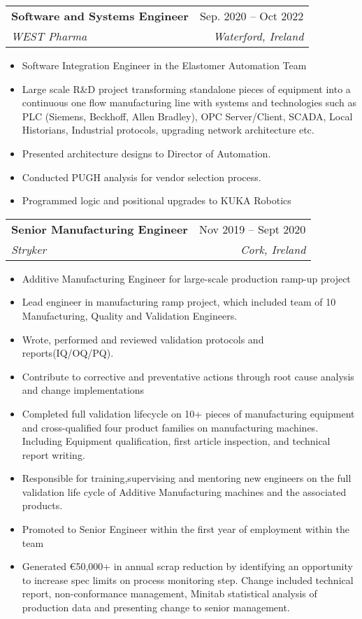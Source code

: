 \documentclass[letterpaper,11pt]{article}
\makeatletter
\newcommand{\resumeItem}[1]{
  \item\small{
    {#1 \vspace{-2pt}}
  }
}
\newcommand{\resumeSubheading}[4]{
  \vspace{-2pt}\item
    \begin{tabular*}{0.97\textwidth}[t]{l@{\extracolsep{\fill}}r}
      \textbf{#1} & #2 \\
      \textit{\small#3} & \textit{\small #4} \\
    \end{tabular*}\vspace{-7pt}
}
\newcommand{\resumeSubSubheading}[2]{
    \item
    \begin{tabular*}{0.97\textwidth}{l@{\extracolsep{\fill}}r}
      \textit{\small#1} & \textit{\small #2} \\
    \end{tabular*}\vspace{-7pt}
}
\newcommand{\resumeSubHeadingListEnd}{\end{itemize}}
\newcommand{\resumeItemListStart}{\begin{itemize}}
\newcommand{\resumeItemListEnd}{\end{itemize}\vspace{-5pt}}
\makeatother
\begin{document}

    \resumeSubheading
      {Software and Systems Engineer}{Sep. 2020 -- Oct 2022}
      {WEST Pharma}{Waterford, Ireland}
      \resumeItemListStart
        \resumeItem{Software Integration Engineer in the Elastomer Automation Team}
        \resumeItem{Large scale R\&D project transforming standalone pieces of equipment into a continuous one flow manufacturing line with systems and technologies such as PLC (Siemens, Beckhoff, Allen Bradley), OPC Server/Client, SCADA, Local Historians, Industrial protocols, upgrading network architecture etc.}
        \resumeItem{Presented architecture designs to Director of Automation.}
        \resumeItem{Conducted PUGH analysis for vendor selection process.}
        \resumeItem{Programmed logic and positional upgrades to KUKA Robotics}
    \resumeItemListEnd

    \resumeSubheading
      {Senior Manufacturing Engineer}{Nov 2019 -- Sept 2020}
      {Stryker}{Cork, Ireland}
      \resumeItemListStart
        \resumeItem{Additive Manufacturing Engineer for large-scale production ramp-up project}
        \resumeItem{Lead engineer in manufacturing ramp project, which included team of 10 Manufacturing, Quality and Validation Engineers.}
        \resumeItem{Wrote, performed and reviewed validation protocols and reports(IQ/OQ/PQ).}
        \resumeItem{Contribute to corrective and preventative actions through root cause analysis and change implementations}
        \resumeItem{Completed full validation lifecycle on 10+ pieces of manufacturing equipment and cross-qualified four product families on manufacturing machines. Including Equipment qualification, first article inspection, and technical report writing.}
        \resumeItem{Responsible for training,supervising and mentoring new engineers on the full validation life cycle of Additive Manufacturing machines and the associated products.}
        \resumeItem{Promoted to Senior Engineer within the first year of employment within the team}
        \resumeItem{Generated €50,000+ in annual scrap reduction by identifying an opportunity to increase spec limits on process monitoring step.
        Change included technical report, non-conformance management, Minitab statistical analysis of production data and presenting change to senior management.}
  \resumeSubHeadingListEnd
\end{document}
